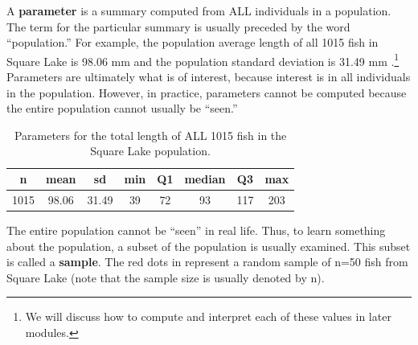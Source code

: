 \documentclass[10pt,openany]{book}\usepackage[]{graphicx}\usepackage[]{color}
\begin{document}
A \textbf{parameter} is a summary computed from ALL individuals in a population.  The term for the particular summary is usually preceded by the word ``population.'' For example, the population average length of all 1015 fish in Square Lake is 98.06 mm and the population standard deviation is 31.49 mm .\footnote{We will discuss how to compute and interpret each of these values in later modules.} Parameters are ultimately what is of interest, because interest is in all individuals in the population. However, in practice, parameters cannot be computed because the entire population cannot usually be ``seen.''
\begin{table}[ht]
\centering
\caption{Parameters for the total length of ALL 1015 fish in the Square Lake population.} 
\label{tab:SquareLakePopn}
\begin{tabular}{cccccccc}
 n & mean & sd & min & Q1 & median & Q3 & max \\ 
  \hline
1015 & 98.06 & 31.49 & 39 & 72 & 93 & 117 & 203 \\ 
   \hline
\end{tabular}
\end{table}


The entire population cannot be ``seen'' in real life. Thus, to learn something about the population, a subset of the population is usually examined. This subset is called a \textbf{sample}. The red dots in  represent a random sample of n=50 fish from Square Lake (note that the sample size is usually denoted by n).
\end{document}

